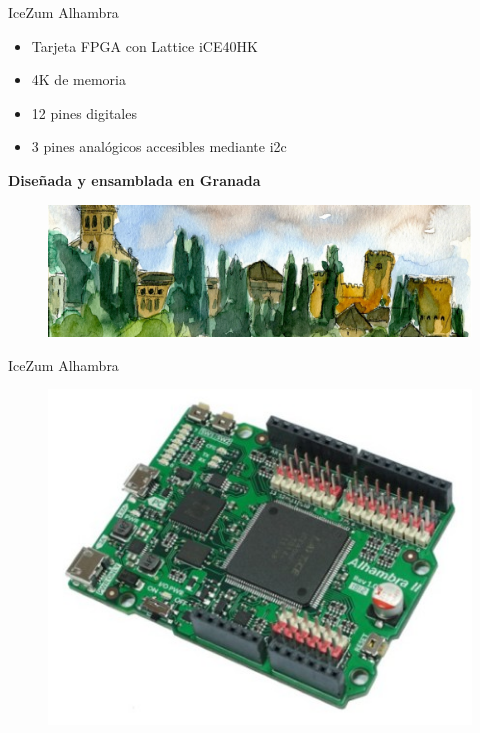 \documentclass{beamer}
\begin{document}
\begin{frame}{IceZum Alhambra}
	\begin{block}{}
		\begin{itemize}
			\item Tarjeta FPGA con Lattice iCE40HK \pause
			\item 4K de memoria \pause
			\item 12 pines digitales \pause
			\item 3 pines analógicos accesibles mediante i2c \pause
		\end{itemize}
	\end{block}
\begin{alertblock}{}
		\centering	\textbf{Diseñada y ensamblada en Granada}
		\begin{figure}[H]
			\center
			\includegraphics[trim = 0cm 0mm 0mm 0cm,clip, angle=0, scale = 0.2]{imagenes/Introduction/alhambrabits}
		\end{figure}
\end{alertblock}
\end{frame}

\begin{frame}{IceZum Alhambra}
	\begin{figure}[H]
		\center
		\includegraphics[trim = 0cm 0mm 0mm 0cm,clip, angle=0, scale = 0.5]{imagenes/EstadoArte/IceZumAlhambraII}
	\end{figure}
\end{frame}
\end{document}
